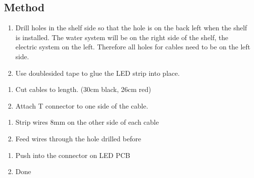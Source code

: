 \documentclass[letterpaper,10pt,english]{sphinxmanual}
\begin{document}
\subsection{Method}
\label{\detokenize{light_shelves:method}}
\noindent{}
\begin{enumerate}
%
\item {} 
Drill holes in the shelf side so that the hole is on the back left when the shelf is installed. The water system will be on the right side of the shelf, the electric system on the left. Therefore all holes for cables need to be on the left side.

\item {} 
Use double\sphinxhyphen{}sided tape to glue the LED strip into place.

\end{enumerate}

\noindent{}

\noindent{}
\begin{enumerate}
%
\setcounter{enumi}{2}
\item {} 
Cut cables to length. (30cm black, 26cm red)

\item {} 
Attach T connector to one side of the cable.

\end{enumerate}

\noindent{}

\noindent{}

\noindent{}
\begin{enumerate}
%
\setcounter{enumi}{4}
\item {} 
Strip wires 8mm on the other side of each cable

\item {} 
Feed wires through the hole drilled before

\end{enumerate}

\noindent{}
\begin{enumerate}
%
\setcounter{enumi}{6}
\item {} 
Push into the connector on LED PCB

\item {} 
Done

\end{enumerate}
\end{document}
